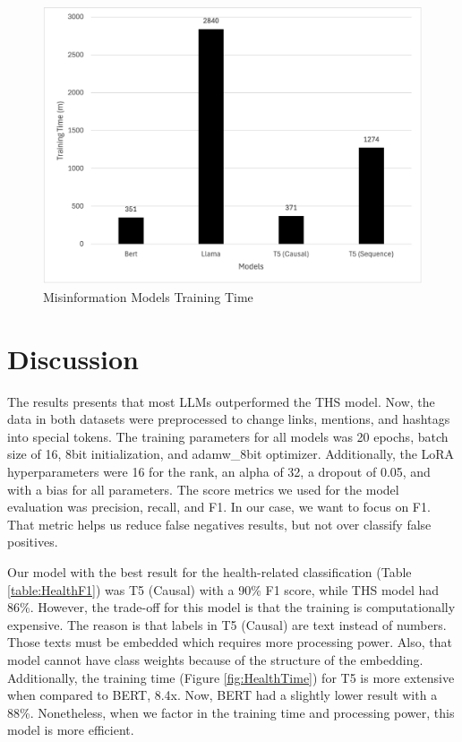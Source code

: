 \begin{figure}[H]
	\begin{center}
		\includegraphics[width=1\textwidth]{images/Misinformation_training_time.png} %
	\end{center}
	\caption{Misinformation Models Training Time} %
	\label{fig:MisinformationTime}
\end{figure}



\section{Discussion}

The results presents that most LLMs outperformed the THS model. Now, the data in both datasets were preprocessed to change links, mentions, and hashtags into special tokens.
The training parameters for all models was 20 epochs, batch size of 16, 8bit initialization, and adamw\_8bit optimizer. Additionally, the LoRA hyperparameters were 16 for the rank,
an alpha of 32, a dropout of 0.05, and with a bias for all parameters. The score metrics we used for the model evaluation was precision, recall, and F1. In our case, we want to
focus on F1. That metric helps us reduce false negatives results, but not over classify false positives.

Our model with the best result for the health-related classification (Table \ref{table:HealthF1}) was T5 (Causal) with a 90\% F1 score, while THS model had 86\%. However, the trade-off for
this model is that the training is computationally expensive. The reason is that labels in T5 (Causal) are text instead of numbers. Those texts must be embedded which requires more
processing power. Also, that model cannot have class weights because of the structure of the embedding. Additionally, the training time (Figure \ref{fig:HealthTime}) for T5 is more extensive when
compared to BERT, 8.4x. Now, BERT had a slightly lower result with a 88\%. Nonetheless, when we factor in the training time and processing power, this model is more efficient. 

